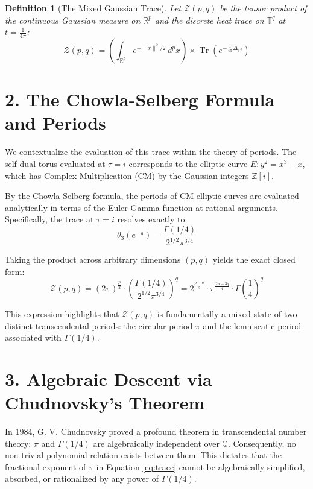 \documentclass[12pt]{article}
\newtheorem{definition}{Definition}
\begin{document}
\begin{definition}[The Mixed Gaussian Trace]
Let $\mathcal{Z}(p, q)$ be the tensor product of the continuous Gaussian measure on $\mathbb{R}^p$ and the discrete heat trace on $\mathbb{T}^q$ at $t = \frac{1}{4\pi}$:
\begin{equation}
    \mathcal{Z}(p, q) = \left( \int_{\mathbb{R}^p} e^{-\|x\|^2/2} \, d^px \right) \times \operatorname{Tr}\left(e^{-\frac{1}{4\pi}\Delta_{\mathbb{T}^q}}\right)
\end{equation}
\end{definition}

\section*{2. The Chowla-Selberg Formula and Periods}
We contextualize the evaluation of this trace within the theory of periods. The self-dual torus evaluated at $\tau = i$ corresponds to the elliptic curve $E: y^2 = x^3 - x$, which has Complex Multiplication (CM) by the Gaussian integers $\mathbb{Z}[i]$.

By the Chowla-Selberg formula, the periods of CM elliptic curves are evaluated analytically in terms of the Euler Gamma function at rational arguments. Specifically, the trace at $\tau=i$ resolves exactly to:
\begin{equation}
    \theta_3(e^{-\pi}) = \frac{\Gamma(1/4)}{2^{1/2}\pi^{3/4}}
\end{equation}

Taking the product across arbitrary dimensions $(p,q)$ yields the exact closed form:
\begin{equation}
    \mathcal{Z}(p, q) = (2\pi)^{\frac{p}{2}} \cdot \left(\frac{\Gamma(1/4)}{2^{1/2}\pi^{3/4}}\right)^q = 2^{\frac{p-q}{2}} \cdot \pi^{\frac{2p-3q}{4}} \cdot \Gamma\left(\frac{1}{4}\right)^q \label{eq:trace}
\end{equation}

This expression highlights that $\mathcal{Z}(p,q)$ is fundamentally a mixed state of two distinct transcendental periods: the circular period $\pi$ and the lemniscatic period associated with $\Gamma(1/4)$.

\section*{3. Algebraic Descent via Chudnovsky's Theorem}
In 1984, G. V. Chudnovsky proved a profound theorem in transcendental number theory: $\pi$ and $\Gamma(1/4)$ are algebraically independent over $\mathbb{Q}$. Consequently, no non-trivial polynomial relation exists between them. This dictates that the fractional exponent of $\pi$ in Equation \ref{eq:trace} cannot be algebraically simplified, absorbed, or rationalized by any power of $\Gamma(1/4)$.
\end{document}
